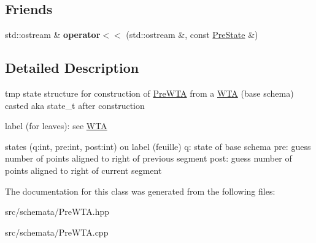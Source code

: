 \subsection*{Friends}
\begin{DoxyCompactItemize}
\item 
\mbox{\label{classPreState_a723cc1f6422323f84329bbb01e13781f}} 
std\+::ostream \& {\bfseries operator$<$$<$} (std\+::ostream \&, const \mbox{\hyperlink{classPreState}{Pre\+State}} \&)
\end{DoxyCompactItemize}


\subsection{Detailed Description}
tmp state structure for construction of \mbox{\hyperlink{classPreWTA}{Pre\+W\+TA}} from a \mbox{\hyperlink{classWTA}{W\+TA}} (base schema) casted aka state\+\_\+t after construction 

label (for leaves)\+: see \mbox{\hyperlink{classWTA}{W\+TA}}

states (q\+:int, pre\+:int, post\+:int) ou label (feuille) q\+: state of base schema pre\+: guess number of points aligned to right of previous segment post\+: guess number of points aligned to right of current segment 

The documentation for this class was generated from the following files\+:\begin{DoxyCompactItemize}
\item 
src/schemata/Pre\+W\+T\+A.\+hpp\item 
src/schemata/Pre\+W\+T\+A.\+cpp\end{DoxyCompactItemize}
